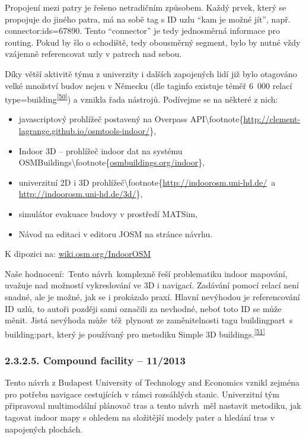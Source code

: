 Propojení mezi patry je řešeno netradičním způsobem. Každý prvek, který se propojuje do jiného patra, má na sobě tag s ID uzlu ``kam je možné jít'', např. connector:ids=67890. Tento ``connector'' je tedy jednosměrná informace pro routing. Pokud by šlo o schodiště, tedy obousměrný segment, bylo by nutné vždy vzájemně referencovat uzly v patrech nad sebou.

Díky větší aktivitě týmu z univerzity i dalších zapojených lidí již bylo otagováno velké množství budov nejen v Německu (dle taginfo existuje téměř 6~000 relací type=building\textsuperscript{\href{}{{[}50{]}}}) a vznikla řada nástrojů. Podívejme se na některé z nich:

\begin{itemize}
\tightlist
\item
  javascriptový prohlížeč postavený na Overpass API\textbackslash{}footnote\{\href{}{http://clement-lagrange.github.io/osmtools-indoor/}\},
\item
  Indoor 3D -- prohlížeč indoor dat na systému OSMBuildings\textbackslash{}footnote\{\href{}{osmbuildings.org/indoor}\},
\item
  univerzitní 2D i 3D prohlížeč\textbackslash{}footnote\{\href{}{http://indoorosm.uni-hd.de/}~a \href{}{http://indoorosm.uni-hd.de/3d/}\},
\item
  simulátor evakuace budovy v prostředí MATSim,
\item
  Návod na editaci v editoru JOSM na stránce návrhu.
\end{itemize}

K dipozici na: \href{}{wiki.osm.org/IndoorOSM}

Naše hodnocení:~Tento návrh~komplexně řeší problematiku indoor mapování, uvažuje nad možností vykreslování ve 3D i navigací. Zadávání pomocí relací není snadné, ale je možné, jak se i prokázalo praxí. Hlavní nevýhodou je referencování ID uzlů, to autoři později sami označili za nevhodné, neboť toto ID se může měnit. Jistá nevýhoda může~též~plynout ze zaměnitelnosti tagu buildingpart~s building:part, který je používaný pro metodiku Simple 3D buildings.\textsuperscript{\href{}{{[}51{]}}}

\subsubsection{2.3.2.5. Compound facility -- 11/2013}\label{compound-facility-112013}

Tento návrh z Budapest University of Technology and Economics vznikl zejména pro potřebu navigace cestujících v rámci rozsáhlých stanic. Univerzitní tým připravoval multimodální plánovač tras a tento návrh~měl nastavit metodiku, jak tagovat indoor mapy s ohledem na složitější modely pater a hledání tras v napojených plochách.

